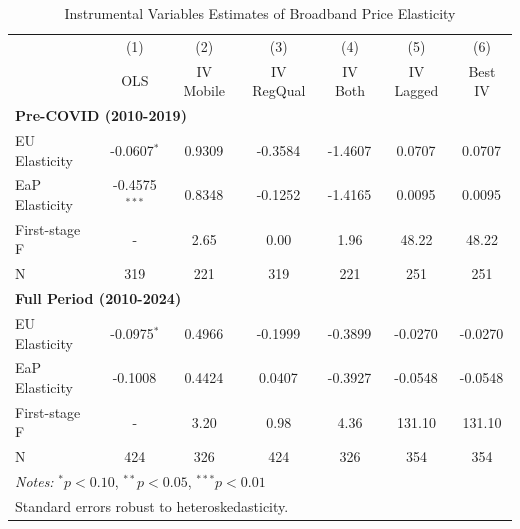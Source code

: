 \begin{table}[htbp]
\centering
\caption{Instrumental Variables Estimates of Broadband Price Elasticity}
\label{tab:iv_results}
\begin{tabular}{lcccccc}
\hline\hline
 & (1) & (2) & (3) & (4) & (5) & (6) \\
 & OLS & IV Mobile & IV RegQual & IV Both & IV Lagged & Best IV \\
\hline
\multicolumn{7}{l}{\textbf{Pre-COVID (2010-2019)}} \\
EU Elasticity & -0.0607$^{*}$ & 0.9309$^{}$ & -0.3584$^{}$ & -1.4607$^{}$ & 0.0707$^{}$ & 0.0707$^{}$ \\
EaP Elasticity & -0.4575$^{***}$ & 0.8348$^{}$ & -0.1252$^{}$ & -1.4165$^{}$ & 0.0095$^{}$ & 0.0095$^{}$ \\
First-stage F & - & 2.65 & 0.00 & 1.96 & 48.22 & 48.22 \\
N & 319 & 221 & 319 & 221 & 251 & 251 \\
\hline
\multicolumn{7}{l}{\textbf{Full Period (2010-2024)}} \\
EU Elasticity & -0.0975$^{*}$ & 0.4966$^{}$ & -0.1999$^{}$ & -0.3899$^{}$ & -0.0270$^{}$ & -0.0270$^{}$ \\
EaP Elasticity & -0.1008$^{}$ & 0.4424$^{}$ & 0.0407$^{}$ & -0.3927$^{}$ & -0.0548$^{}$ & -0.0548$^{}$ \\
First-stage F & - & 3.20 & 0.98 & 4.36 & 131.10 & 131.10 \\
N & 424 & 326 & 424 & 326 & 354 & 354 \\
\hline
\multicolumn{7}{l}{\textit{Notes:} $^{*}p<0.10$, $^{**}p<0.05$, $^{***}p<0.01$} \\
\multicolumn{7}{l}{Standard errors robust to heteroskedasticity.} \\
\end{tabular}
\end{table}